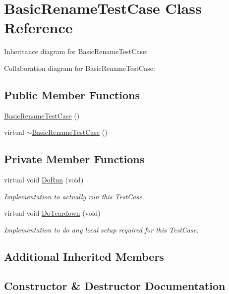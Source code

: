 \hypertarget{classBasicRenameTestCase}{}\section{Basic\+Rename\+Test\+Case Class Reference}
\label{classBasicRenameTestCase}


Inheritance diagram for Basic\+Rename\+Test\+Case\+:


Collaboration diagram for Basic\+Rename\+Test\+Case\+:
\subsection*{Public Member Functions}
\begin{DoxyCompactItemize}
\item 
\hyperlink{classBasicRenameTestCase_af9a37ed0e16713a3ff5e622a22e75a69}{Basic\+Rename\+Test\+Case} ()
\item 
virtual \hyperlink{classBasicRenameTestCase_ae1f2bd89317e54c8f0adb98f9811837b}{$\sim$\+Basic\+Rename\+Test\+Case} ()
\end{DoxyCompactItemize}
\subsection*{Private Member Functions}
\begin{DoxyCompactItemize}
\item 
virtual void \hyperlink{classBasicRenameTestCase_acab9031637e73bcd62339d0a702d5105}{Do\+Run} (void)
\begin{DoxyCompactList}\small\item\em Implementation to actually run this Test\+Case. \end{DoxyCompactList}\item 
virtual void \hyperlink{classBasicRenameTestCase_a3d88c0176446cdbcce75adce39724c29}{Do\+Teardown} (void)
\begin{DoxyCompactList}\small\item\em Implementation to do any local setup required for this Test\+Case. \end{DoxyCompactList}\end{DoxyCompactItemize}
\subsection*{Additional Inherited Members}


\subsection{Constructor \& Destructor Documentation}
